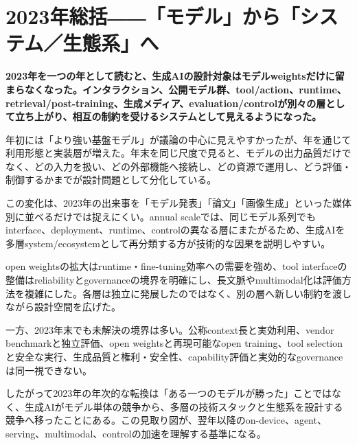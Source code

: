 \section{2023年総括――「モデル」から「システム／生態系」へ}
\noindent\textbf{2023年を一つの年として読むと、生成AIの設計対象はモデルweightsだけに留まらなくなった。インタラクション、公開モデル群、tool/action、runtime、retrieval/post-training、生成メディア、evaluation/controlが別々の層として立ち上がり、相互の制約を受けるシステムとして見えるようになった。}

年初には「より強い基盤モデル」が議論の中心に見えやすかったが、年を通じて利用形態と実装層が増えた。年末を同じ尺度で見ると、モデルの出力品質だけでなく、どの入力を扱い、どの外部機能へ接続し、どの資源で運用し、どう評価・制御するかまでが設計問題として分化している。


この変化は、2023年の出来事を「モデル発表」「論文」「画像生成」といった媒体別に並べるだけでは捉えにくい。annual scaleでは、同じモデル系列でもinterface、deployment、runtime、controlの異なる層にまたがるため、生成AIを多層system/ecosystemとして再分類する方が技術的な因果を説明しやすい。


open weightsの拡大はruntime・fine-tuning効率への需要を強め、tool interfaceの整備はreliabilityとgovernanceの境界を明確にし、長文脈やmultimodal化は評価方法を複雑にした。各層は独立に発展したのではなく、別の層へ新しい制約を渡しながら設計空間を広げた。


一方、2023年末でも未解決の境界は多い。公称context長と実効利用、vendor benchmarkと独立評価、open weightsと再現可能なopen training、tool selectionと安全な実行、生成品質と権利・安全性、capability評価と実効的なgovernanceは同一視できない。


したがって2023年の年次的な転換は「ある一つのモデルが勝った」ことではなく、生成AIがモデル単体の競争から、多層の技術スタックと生態系を設計する競争へ移ったことにある。この見取り図が、翌年以降のon-device、agent、serving、multimodal、controlの加速を理解する基準になる。

